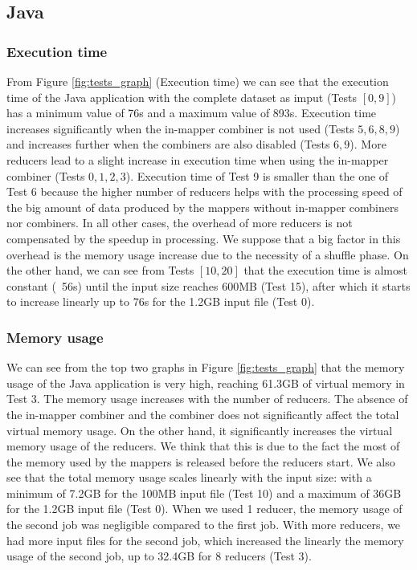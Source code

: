 \documentclass{article}
\begin{document}
\begin{multicols}{2}
    \subsection{Java}
        \subsubsection{Execution time}
            From Figure \ref{fig:tests_graph} (Execution time) we can see that the execution time of the
            Java application with the complete dataset as imput (Tests $[0,9]$) has a minimum value of 76s and
            a maximum value of 893s.
            Execution time increases significantly when the in-mapper combiner is not used (Tests ${5,6,8,9}$)
            and increases further when the combiners are also disabled (Tests ${6,9}$).
            More reducers lead to a slight increase in execution time when using the in-mapper combiner 
            (Tests ${0,1,2,3}$). Execution time of Test 9 is smaller than the one of Test 6 because the
            higher number of reducers helps with the processing speed of the big amount of data produced 
            by the mappers without in-mapper combiners nor combiners.
            In all other cases, the overhead of more reducers is not compensated by the speedup in processing.
            We suppose that a big factor in this overhead is the memory usage increase due to the necessity of
            a shuffle phase.
            On the other hand, we can see from Tests $[10,20]$ that the execution time is almost constant
            (~56s) until the input size reaches 600MB (Test 15), after which it starts to increase linearly
            up to 76s for the 1.2GB input file (Test 0).
        \subsubsection{Memory usage}
            We can see from the top two graphs in Figure \ref{fig:tests_graph} that the memory usage of the Java
            application is very high, reaching 61.3GB of virtual memory in Test 3.
            The memory usage increases with the number of reducers. 
            The absence of the in-mapper combiner and the combiner does not significantly affect the 
            total virtual memory usage. On the other hand, it significantly increases the virtual memory 
            usage of the reducers. 
            We think that this is due to the fact the most of the memory used by the mappers is released
            before the reducers start.
            We also see that the total memory usage scales linearly with the input size: with a minimum of
            7.2GB for the 100MB input file (Test 10) and a maximum of 36GB for the 1.2GB input file (Test 0).
            When we used 1 reducer, the memory usage of the second job was negligible compared to the first job.
            With more reducers, we had more input files for the second job, which increased the linearly
            the memory usage of the second job, up to 32.4GB for 8 reducers (Test 3).

\end{multicols}
\end{document}
